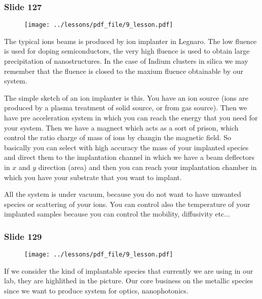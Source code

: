 \documentclass[../main/main.tex]{subfiles}
\begin{document}
\newpage

\subsubsection{Slide 127}

\begin{figure}[h!]
\centering
\texttt{[image: ../lessons/pdf\_file/9\_lesson.pdf]}
\end{figure}

The typical ions beams is produced by ion implanter in Legnaro.
The low fluence is used for doping semiconductors, the very high fluence is used to obtain large precipitation of nanostructures. In the case of Indium clusters in silica we may remember that the fluence is closed to the maxium fluence obtainable by our system.

The simple sketch of an ion implanter is this. You have an ion source (ions are produced by a plasma treatment of solid source, or from gas source). Then we have pre acceleration system in which you can reach the energy that you need for your system.
Then we have a magnect which acts as a sort of prison, which control the ratio charge of mass of ions by changin the magnetic field. So basically you can select with high accuracy the mass of your implanted species and direct them to the implantation channel in which we have a beam deflectors in \( x \) and \( y \) direction (area) and then you can reach your implantation chamber in which you have your substrate that you want to implant.

All the system is under vacuum, because you do not want to have unwanted species or scattering of your ions.
You can control also the temperature of your implanted samples because you can control the mobility, diffusivity etc...

\newpage

\subsubsection{Slide 129}

\begin{figure}[h!]
\centering
\texttt{[image: ../lessons/pdf\_file/9\_lesson.pdf]}
\end{figure}

If we consider the kind of implantable species that currently we are using in our lab, they are highlithed in the picture. Our core business on the metallic species since we want to produce system for optics, nanophotonics.
\end{document}
